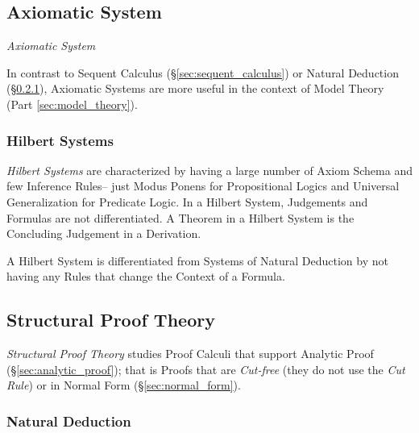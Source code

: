 \subsection{Axiomatic System} \label{sec:axiomatic_system}

\emph{Axiomatic System}

In contrast to Sequent Calculus (\S\ref{sec:sequent_calculus}) or
Natural Deduction (\S\ref{sec:natural_deduction}), Axiomatic Systems
are more useful in the context of Model Theory (Part
\ref{sec:model_theory}).



\subsubsection{Hilbert Systems}\label{sec:hilbert_systems}

\emph{Hilbert Systems} are characterized by having a large number of
Axiom Schema and few Inference Rules-- just Modus Ponens for
Propositional Logics and Universal Generalization for Predicate
Logic. In a Hilbert System, Judgements and Formulas are not
differentiated. A Theorem in a Hilbert System is the Concluding
Judgement in a Derivation.

A Hilbert System is differentiated from Systems of Natural Deduction
by not having any Rules that change the Context of a Formula.



\subsection{Structural Proof Theory}\label{sec:structural_proof}

\emph{Structural Proof Theory} studies Proof Calculi that support
Analytic Proof (\S\ref{sec:analytic_proof}); that is Proofs that are
\emph{Cut-free} (they do not use the \emph{Cut Rule}) or in Normal
Form (\S\ref{sec:normal_form}).



\subsubsection{Natural Deduction}\label{sec:natural_deduction}
\cite{prawitz65}

